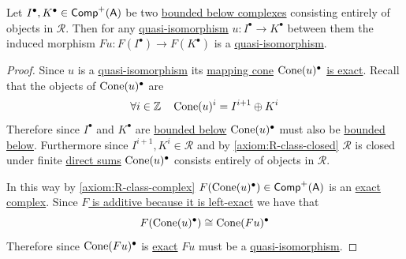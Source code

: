 \documentclass[../../../main]{subfiles}
\begin{document}
\begin{lemma}\label{lemma:induced-morphism-from-qis}
  Let \(I^{\bullet}, K^{\bullet} \in \Complex[+]{\category{A}}\) be two \hyperref[def:bounded-complexes]{bounded below complexes} consisting entirely of objects in \(\mathcal{R}\).
  Then for any \hyperref[def:quasi-isomorphism]{quasi-isomorphism} \(u: I^{\bullet} \to K^{\bullet}\) between them the induced morphism \(Fu: F(I^{\bullet}) \to F(K^{\bullet})\) is a \hyperref[def:quasi-isomorphism]{quasi-isomorphism}.
\end{lemma}
\begin{proof}
  Since \(u\) is a \hyperref[def:quasi-isomorphism]{quasi-isomorphism} its \hyperref[def:mapping-cone]{mapping cone} \(\mCone{u}{\bullet}\) \hyperref[rem:quasi-isomorphism-and-mapping-cone]{is exact}.
  Recall that the objects of \(\mCone{u}{\bullet}\) are
  \begin{equation*}
    \forall i \in \mathbb{Z} \quad \mCone{u}{i} = I^{i+1} \oplus K^{i}
  \end{equation*}
  Therefore since \(I^{\bullet}\) and \(K^{\bullet}\) are \hyperref[def:bounded-complexes]{bounded below} \(\mCone{u}{\bullet}\) must also be \hyperref[def:bounded-complexes]{bounded below}.
  Furthermore since \(I^{i+1}, K^{i} \in \mathcal{R}\) and by \ref{axiom:R-class-closed} \(\mathcal{R}\) is closed under finite \hyperref[def:direct-sum]{direct sums} \(\mCone{u}{\bullet}\) consists entirely of objects in \(\mathcal{R}\).

  In this way by \ref{axiom:R-class-complex} \(F(\mCone{u}{\bullet}) \in \Complex[+]{\category{A}}\) is an \hyperref[def:exact-complex]{exact complex}.
  Since \hyperref[lemma:exact-is-additive]{\(F\) is additive because it is left-exact} we have that
  \begin{equation*}
    F(\mCone{u}{\bullet}) \cong \mCone{Fu}{\bullet}
  \end{equation*}
  Therefore since \(\mCone{Fu}{\bullet}\) is \hyperref[def:exact-complex]{exact} \(Fu\) must be a \hyperref[def:quasi-isomorphism]{quasi-isomorphism}.
\end{proof}
\end{document}
